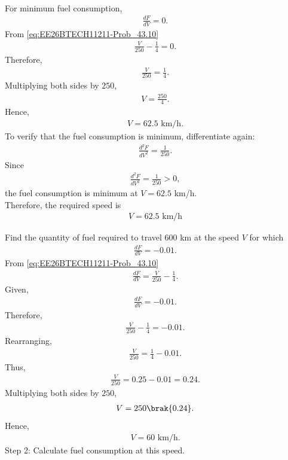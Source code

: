 \begin{enumerate}[label=\thesubsection.\arabic*, ref=\thesubsection.\theenumi]
\\For minimum fuel consumption,
\begin{align}
\frac{dF}{dV}=0.
\end{align}
From \eqref{eq:EE26BTECH11211-Prob_43.10}
\begin{align}
\frac{V}{250}-\frac{1}{4}=0.
\end{align}
Therefore,
\begin{align}
\frac{V}{250}=\frac{1}{4}.
\end{align}
Multiplying both sides by $250$,
\begin{align}
V=\frac{250}{4}.
\end{align}
Hence,
\begin{align}
V=62.5\text{ km/h}.
\end{align}
To verify that the fuel consumption is minimum, differentiate
again:
\begin{align}
\frac{d^2F}{dV^2}=\frac{1}{250}.
\end{align}
Since
\begin{align}
\frac{d^2F}{dV^2}=\frac{1}{250}>0,
\end{align}
the fuel consumption is minimum at $V=62.5$ km/h.
\\Therefore, the required speed is
\begin{align}
V=62.5\text{ km/h}
\end{align}

Find the quantity of fuel required to travel $600$ km at the speed
$V$ for which
\begin{align}
\frac{dF}{dV}=-0.01.
\end{align}
From \eqref{eq:EE26BTECH11211-Prob_43.10}
\begin{align}
\frac{dF}{dV}=\frac{V}{250}-\frac{1}{4}.
\end{align}
Given,
\begin{align}
\frac{dF}{dV}=-0.01.
\end{align}
Therefore,
\begin{align}
\frac{V}{250}-\frac{1}{4}=-0.01.
\end{align}
Rearranging,
\begin{align}
\frac{V}{250}=\frac{1}{4}-0.01.
\end{align}
Thus,
\begin{align}
\frac{V}{250}=0.25-0.01=0.24.
\end{align}
Multiplying both sides by $250$,
\begin{align}
V=250\brak{0.24}.
\end{align}
Hence,
\begin{align}
V=60\text{ km/h}.
\end{align}
{Step 2: Calculate fuel consumption at this speed.}


\end{enumerate}
